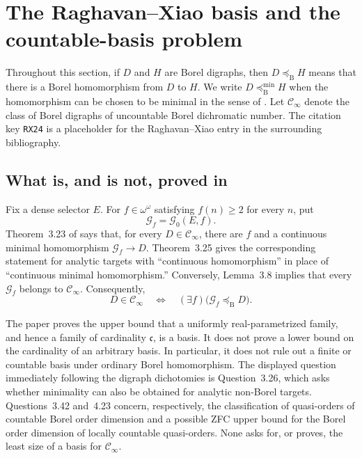 \section{The Raghavan--Xiao basis and the countable-basis problem}
\label{sec:rxcb}

Throughout this section, if $D$ and $H$ are Borel digraphs, then
$D\preceq_{\mathrm B}H$ means that there is a Borel homomorphism from
$D$ to $H$.  We write $D\preceq^{\min}_{\mathrm B}H$ when the
homomorphism can be chosen to be minimal in the sense of
\cite[Definition~3.10]{RX24}.  Let $\mathcal C_\infty$ denote the class
of Borel digraphs of uncountable Borel dichromatic number.  The
citation key \texttt{RX24} is a placeholder for the Raghavan--Xiao
entry in the surrounding bibliography.

\subsection{What is, and is not, proved in \cite{RX24}}
\label{subsec:rxcb-audit}

Fix a dense selector $E$.  For $f\in\omega^\omega$ satisfying
$f(n)\geq2$ for every $n$, put
\[
  \mathcal G_f=\mathcal G_0(E,f).
\]
Theorem~3.23 of \cite{RX24} says that, for every
$D\in\mathcal C_\infty$, there are $f$ and a continuous minimal
homomorphism $\mathcal G_f\to D$.  Theorem~3.25 gives the corresponding
statement for analytic targets with ``continuous homomorphism'' in
place of ``continuous minimal homomorphism.''  Conversely,
Lemma~3.8 implies that every $\mathcal G_f$ belongs to
$\mathcal C_\infty$.  Consequently,
\begin{equation}
  D\in\mathcal C_\infty
  \quad\Longleftrightarrow\quad
  (\exists f)\bigl(\mathcal G_f\preceq_{\mathrm B}D\bigr).
  \label{eq:rxcb-basis}
\end{equation}

The paper proves the upper bound that a uniformly real-parametrized
family, and hence a family of cardinality $\mathfrak c$, is a basis.
It does not prove a lower bound on the cardinality of an arbitrary
basis.  In particular, it does not rule out a finite or countable
basis under ordinary Borel homomorphism.  The displayed question
immediately following the digraph dichotomies is Question~3.26, which
asks whether minimality can also be obtained for analytic non-Borel
targets.  Questions~3.42 and~4.23 concern, respectively, the
classification of quasi-orders of countable Borel order dimension and
a possible ZFC upper bound for the Borel order dimension of locally
countable quasi-orders.  None asks for, or proves, the least size of a
basis for $\mathcal C_\infty$.

